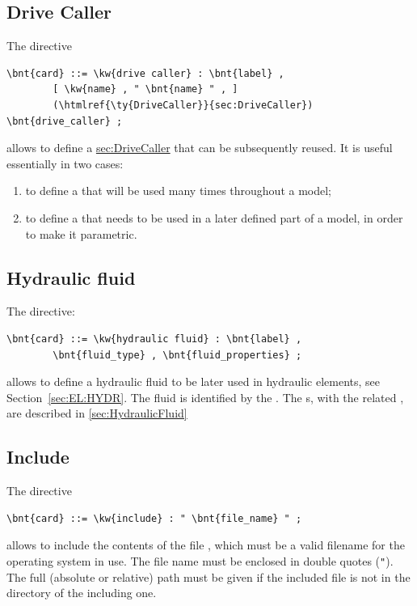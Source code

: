\subsection{Drive Caller}\label{sec:DRIVE-CALLER}
The  directive
\begin{Verbatim}[commandchars=\\\{\}]
    \bnt{card} ::= \kw{drive caller} : \bnt{label} ,
        [ \kw{name} , " \bnt{name} " , ]
        (\htmlref{\ty{DriveCaller}}{sec:DriveCaller}) \bnt{drive_caller} ;
\end{Verbatim}
allows to define
a \hyperref{\kw{drive caller}}{\kw{drive caller} (see Section~}{)}{sec:DriveCaller}
that can be subsequently reused.
It is useful essentially in two cases:
\begin{enumerate}
	\renewcommand{\labelenumi}{\alph{enumi})}
	\item to define a 
	that will be used many times throughout a model;
	\item to define a  
	that needs to be used in a later defined part of a model, 
	in order to make it parametric.
\end{enumerate}



\subsection{Hydraulic fluid}\label{sec:HYDRAULIC-FLUID}
The  directive:
\begin{Verbatim}[commandchars=\\\{\}]
    \bnt{card} ::= \kw{hydraulic fluid} : \bnt{label} , 
        \bnt{fluid_type} , \bnt{fluid_properties} ;
\end{Verbatim}
allows to define a hydraulic fluid to be later used in hydraulic elements,
see Section~\ref{sec:EL:HYDR}.
The fluid is identified by the . 
The s, with the related , are
described in \ref{sec:HydraulicFluid}



\subsection{Include}\label{sec:INCLUDE}
The  directive
\begin{Verbatim}[commandchars=\\\{\}]
    \bnt{card} ::= \kw{include} : " \bnt{file_name} " ;
\end{Verbatim}
allows to include the contents of the file
,
which must be a valid filename for the operating system in
use.
The file name must be enclosed in double quotes (\texttt{"}).
The full (absolute or relative) path must be given if the included file 
is not in the directory of the including one.

